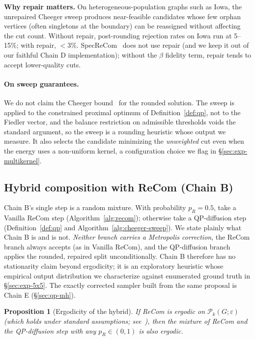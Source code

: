 \documentclass[11pt]{article}
\newtheorem{proposition}{Proposition}[section]
\begin{document}
\textbf{Why repair matters.} On heterogeneous-population graphs such
as Iowa, the unrepaired Cheeger sweep produces near-feasible
candidates whose few orphan vertices (often singletons at the
boundary) can be reassigned without affecting the cut count.
Without repair, post-rounding rejection rates on Iowa run at 5--15\%;
with repair, $<3\%$. SpecReCom~\cite{davies2025spectral} does not use
repair (and we keep it out of our faithful Chain D
implementation); without the $\beta$ fidelity term, repair tends to
accept lower-quality cuts.

\paragraph{On sweep guarantees.} We do not claim the Cheeger
bound~\cite{chung1997spectral} for the rounded solution. The sweep is
applied to the constrained proximal optimum of
Definition~\ref{def:qp}, not to the Fiedler vector, and the balance
restriction on admissible thresholds voids the standard argument, so
the sweep is a rounding heuristic whose output we measure. It also
selects the candidate minimizing the \emph{unweighted} cut even when
the energy uses a non-uniform kernel, a configuration choice we flag
in \S\ref{sec:exp-multikernel}.

\subsection{Hybrid composition with ReCom (Chain B)}\label{sec:hybrid-mh}

Chain B's single step is a random mixture. With probability
$p_R = 0.5$, take a Vanilla ReCom step (Algorithm~\ref{alg:recom});
otherwise take a QP-diffusion step (Definition~\ref{def:qp} and
Algorithm~\ref{alg:cheeger-sweep}). We state plainly what Chain B is
and is not. \emph{Neither branch carries a Metropolis correction}, the ReCom branch always accepts (as in Vanilla ReCom), and the
QP-diffusion branch applies the rounded, repaired split
unconditionally. Chain B therefore has no stationarity claim beyond
ergodicity; it is an exploratory heuristic whose empirical output
distribution we characterize against enumerated ground truth in
\S\ref{sec:exp-5x5}. The exactly corrected sampler built from the same
proposal is Chain E (\S\ref{sec:qp-mh}).

\begin{proposition}[Ergodicity of the hybrid]\label{prop:ergodic}
If ReCom is ergodic on $\mathcal{P}_k(G; \varepsilon)$ (which holds
under standard assumptions; see~\cite{deford2021recombination,
cannon2024irreducibility}), then the mixture of ReCom and
the QP-diffusion step with any $p_R \in (0, 1)$ is also ergodic.
\end{proposition}
\end{document}
